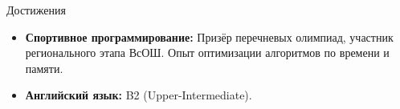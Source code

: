 \documentclass{resume} %
\begin{document}
\begin{rSection}{Достижения}
\begin{itemize}
    \itemsep -3pt {}
    \item \textbf{Спортивное программирование:} Призёр перечневых олимпиад, участник регионального этапа ВсОШ. Опыт оптимизации алгоритмов по времени и памяти.
    \item \textbf{Английский язык:} B2 (Upper-Intermediate).
\end{itemize}
\end{rSection} 

\end{document}
